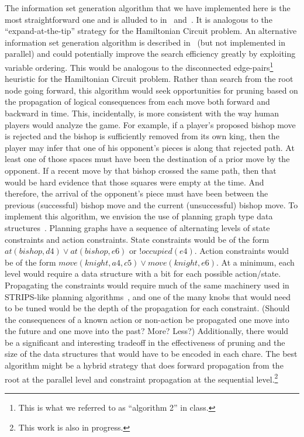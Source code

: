 \documentclass[times, 10pt,twocolumn]{article}
\begin{document}
The information set generation algorithm that we have implemented here is the most straightforward one and is alluded to
in~\cite{parker05game} and~\cite{russell05efficient}.  It is analogous to the ``expand-at-the-tip'' strategy for the
Hamiltonian Circuit problem.  An alternative information set generation algorithm is described
in~\cite{richards09information} (but not implemented in parallel) and could potentially improve the search efficiency
greatly by exploiting variable ordering.  This would be analogous to the disconnected edge-pairs\footnote{This is what we
referred to as ``algorithm 2'' in class.} heuristic for the Hamiltonian Circuit problem.  Rather than search from the
root node going forward, this algorithm would seek opportunities for pruning based on the propagation of logical
consequences from each move both forward and backward in time.  This, incidentally, is more consistent with the way
human players would analyze the game.  For example, if a player's proposed bishop move is rejected and the bishop is
sufficiently removed from its own king, then the player may infer that one of his opponent's pieces is along that
rejected path.  At least one of those spaces must have been the destination of a prior move by the opponent.  If a
recent move by that bishop crossed the same path, then that would be hard evidence that those squares were empty at the
time.  And therefore, the arrival of the opponent's piece must have been between the previous (successful) bishop move
and the current (unsuccessful) bishop move.  To implement this algorithm, we envision the use of planning graph type
data structures~\cite{blum97fast}.  Planning graphs have a sequence of alternating levels of state constraints and
action constraints.  State constraints would be of the form $at(bishop,d4) \vee at(bishop,e6)$ or $!occupied(e4)$.
Action constraints would be of the form $move(knight,a4,c5) \vee move(knight,e6)$.  At a minimum, each level would
require a data structure with a bit for each possible action/state.  Propagating the constraints would require much of
the same machinery used in STRIPS-like planning algorithms~\cite{chen05solving}, and one of the many knobs that would
need to be tuned would be the depth of the propagation for each constraint.  (Should the consequences of a known action
or non-action be propagated one move into the future and one move into the past?  More?  Less?)  Additionally, there
would be a significant and interesting tradeoff in the effectiveness of pruning and the size of the data
structures that would have to be encoded in each chare.  The best algorithm might be a hybrid strategy that does forward
propagation from the root at the parallel level and constraint propagation at the sequential level.\footnote{This work
is also in progress.}
\end{document}
